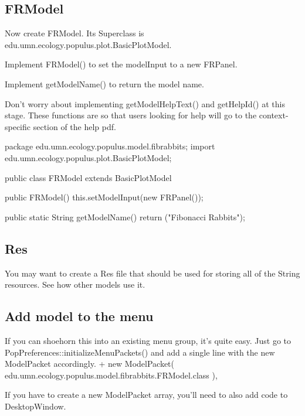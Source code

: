 \documentclass[12pt]{article}
\begin{document}
\subsection{FRModel}
Now create FRModel.  Its Superclass is edu.umn.ecology.populus.plot.BasicPlotModel.

Implement FRModel() to set the modelInput to a new FRPanel.

Implement getModelName() to return the model name.

Don't worry about implementing getModelHelpText() and getHelpId() at this stage.  These functions are so that users looking for help will go to the context-specific section of the help pdf.

package edu.umn.ecology.populus.model.fibrabbits;
import edu.umn.ecology.populus.plot.BasicPlotModel;

public class FRModel extends BasicPlotModel {
	public FRModel() {
		this.setModelInput(new FRPanel());
	}

	public static String getModelName() {
		return ("Fibonacci Rabbits");
	}
}

\subsection{Res}
You may want to create a Res file that should be used for storing all of the String resources.  See how other models use it.

\subsection{Add model to the menu}
If you can shoehorn this into an existing menu group, it's quite easy.  Just go to PopPreferences::initializeMenuPackets() and add a single line with the new ModelPacket accordingly.
+	new ModelPacket( edu.umn.ecology.populus.model.fibrabbits.FRModel.class ),


If you have to create a new ModelPacket array, you'll need to also add code to DesktopWindow.
\end{document}
